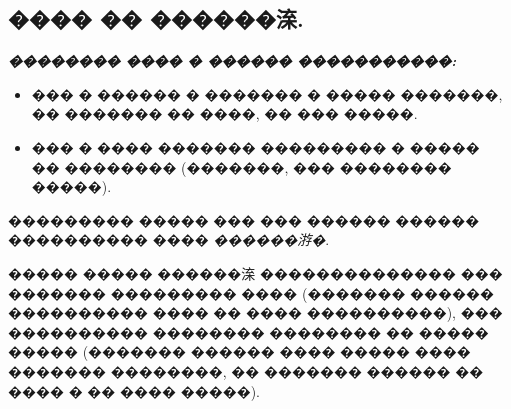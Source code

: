 \documentclass[a4paper,12pt]{article}
\begin{document}
\newpage

\begin{center}
\section*{���� �� ������㳿.}
\end{center}

\textit{\textbf{�������� ���� � ������ �����������: }}

\begin{itemize}

\item ��� � ������ � ������� � ����� �������, �� ������� �� ����, �� ��� �����.

\item ��� � ���� ������� ��������� � ����� �� �������� (�������, ��� �������� �����).
\end{itemize}

��������� ����� ��� ��� ������ ������ ���������� ���� \textit{������㳺�}.

����� ����� ������㳿 �������������� ��� ������� ��������� ���� (������� ������ ���������� ���� �� ���� ����������), ��� ���������� �������� �������� �� ����� ����� (������� ������ ���� ����� ���� ������� ��������, �� ������� ������ �� ���� � �� ���� �����).

\medskip\medskip\medskip
\end{document}
